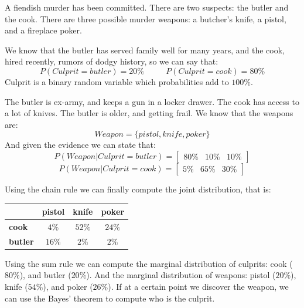 \documentclass[12pt, a4paper]{report}
\newtheorem[style=M,bodystyle=\normalfont]{theorem}{Theorem}
\newtheorem[style=M,bodystyle=\normalfont]{corollary}{Corollary}
\newtheorem[style=M,bodystyle=\normalfont]{lemma}{Lemma}
\newtheorem[style=M,bodystyle=\normalfont]{definition}{Definition}
\begin{document}
    \begin{example}
        A fiendish murder has been committed. There are two suspects: the butler and the cook. There are three possible murder weapons: a butcher's knife, a pistol, and a 
        fireplace poker. 

        We know that the butler has served family well for many years, and the cook, hired recently, rumors of dodgy history, so we can say that: 
        \[P(Culprit=butler)=20\% \:\:\:\:\:\:\:\:\:\:\:\: P(Culprit=cook)=80\%\]
        Culprit is a binary random variable which probabilities add to $100\%$. 

        The butler is ex-army, and keeps a gun in a locker drawer. The cook has access to a lot of knives. The butler is older, and getting frail. We know that the weapons are: 
        \[Weapon=\{pistol,knife,poker\}\]
        And given the evidence we can state that: 
        \[P(Weapon|Culprit=butler)=\begin{bmatrix} 80\% & 10\% & 10\% \end{bmatrix}\]
        \[P(Weapon|Culprit=cook)=\begin{bmatrix} 5\% & 65\% & 30\% \end{bmatrix}\]
        
        Using the chain rule we can finally compute the joint distribution, that is: 
        \begin{table}[H]
            \centering
            \begin{tabular}{c|ccc|}
            \cline{2-4}
                                                  & \textbf{pistol} & \textbf{knife} & \textbf{poker} \\ \hline
            \multicolumn{1}{|l|}{\textbf{cook}}   & $4\%$           & $52\%$         & $24\%$         \\
            \multicolumn{1}{|l|}{\textbf{butler}} & $16\%$          & $2\%$          & $2\%$          \\ \hline
            \end{tabular}
        \end{table}

        Using the sum rule we can compute the marginal distribution of culprits: cook ($80\%$), and butler ($20\%$). 
        And the marginal distribution of weapons: pistol ($20\%$), knife ($54\%$), and poker ($26\%$). 
        If at a certain point we discover the weapon, we can use the Bayes' theorem to compute who is the culprit. 
    \end{example}
\end{document}
